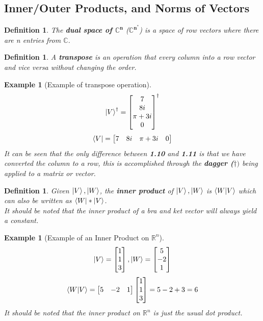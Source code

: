 \documentclass[12pt]{article}
\theoremstyle{plain}
\theoremstyle{nonumberplain}
\theoremstyle{plain}
\newtheorem{definition}[lemma]{Definition}
\newtheorem{example}[lemma]{Example}
\theoremstyle{nonumberplain}
\newcommand\1{{\bf 1}}
\newcommand{\bmat}[1]{\begin{bmatrix*} #1 \end{bmatrix*}} %
\newcommand{\R}{\mathbb{R}} %
\newcommand{\C}{\mathbb{C}} %
\newcommand{\<}{\left\langle}
\renewcommand{\>}{\right\rangle}
\begin{document}
\subsection{Inner/Outer Products, and Norms of Vectors}
\begin{definition}
The \textbf{dual space of $\mathbf{\C^n}$} ($\mathbf{\C^{n^*}}$) is a space of row vectors where there are n entries from $\C$. 
\end{definition}
\begin{definition}
A \textbf{transpose} is an operation that every column into a row vector and vice versa without changing the order.
\end{definition}
\begin{example}[Example of transpose operation]
\begin{equation}
\ket{V}^\dagger = \bmat{7\\ 8i\\ \pi+3i\\ 0}^\dagger
\end{equation}
\begin{equation}
\bra{V} = \bmat{7& 8i& \pi+3i& 0}
\end{equation}
It can be seen that the only difference between \textbf{1.10} and \textbf{1.11} is that we have converted the column to a row, this is accomplished through the \textbf{dagger ($\mathbf{\dagger)}$} being applied to a matrix or vector.
\end{example}

\begin{definition}
Given $\ket{V}, \ket{W}$, the \textbf{inner product} of $\ket{V}, \ket{W}$ is $\braket{W|V}$ which can also be written as ${\bra{W}} * \ket{V}$. \\ \textit{It should be noted that the inner product of a bra and ket vector will always yield a constant}.
\end{definition}

\begin{example}[Example of an Inner Product on $\R^n$]
\begin{equation}
\ket{V} = \bmat{1\\ 1\\ 3}, \ket{W} = \bmat{5\\ -2\\ 1}
\end{equation}
\begin{equation}
\braket{W|V} = \bmat{5& -2& 1}\bmat{1\\ 1\\ 3} = 5 - 2 + 3 = 6
\end{equation}
\textit{It should be noted that the inner product on $\R^n$ is just the usual dot product.}
\end{example}
\end{document}
